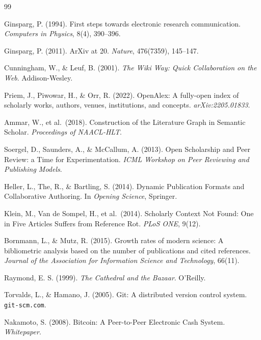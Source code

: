 \documentclass[11pt]{rrvix}
\begin{document}
\begin{thebibliography}{99}

Ginsparg, P. (1994). First steps towards electronic research communication. \emph{Computers in Physics}, 8(4), 390--396.

Ginsparg, P. (2011). ArXiv at 20. \emph{Nature}, 476(7359), 145--147.

Cunningham, W., \& Leuf, B. (2001). \emph{The Wiki Way: Quick Collaboration on the Web}. Addison-Wesley.

Priem, J., Piwowar, H., \& Orr, R. (2022). OpenAlex: A fully-open index of scholarly works, authors, venues, institutions, and concepts. \emph{arXiv:2205.01833}.

Ammar, W., et al.\ (2018). Construction of the Literature Graph in Semantic Scholar. \emph{Proceedings of NAACL-HLT}.

Soergel, D., Saunders, A., \& McCallum, A. (2013). Open Scholarship and Peer Review: a Time for Experimentation. \emph{ICML Workshop on Peer Reviewing and Publishing Models}.

Heller, L., The, R., \& Bartling, S. (2014). Dynamic Publication Formats and Collaborative Authoring. In \emph{Opening Science}, Springer.

Klein, M., Van de Sompel, H., et al.\ (2014). Scholarly Context Not Found: One in Five Articles Suffers from Reference Rot. \emph{PLoS ONE}, 9(12).

Bornmann, L., \& Mutz, R. (2015). Growth rates of modern science: A bibliometric analysis based on the number of publications and cited references. \emph{Journal of the Association for Information Science and Technology}, 66(11).

Raymond, E. S. (1999). \emph{The Cathedral and the Bazaar}. O'Reilly.

Torvalds, L., \& Hamano, J. (2005). Git: A distributed version control system. \texttt{git-scm.com}.

Nakamoto, S. (2008). Bitcoin: A Peer-to-Peer Electronic Cash System. \emph{Whitepaper}.


\end{thebibliography}
\end{document}
